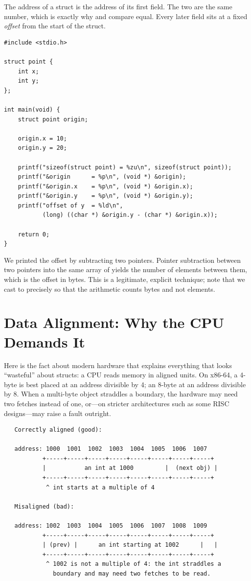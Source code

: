 The address of a struct is the address of its first field. The two are
the same number, which is exactly why  and
 compare equal. Every later field sits at a fixed
\emph{offset} from the start of the struct.

\begin{lstlisting}[caption={A struct is an int and another int, one after another.}]
#include <stdio.h>

struct point {
    int x;
    int y;
};

int main(void) {
    struct point origin;

    origin.x = 10;
    origin.y = 20;

    printf("sizeof(struct point) = %zu\n", sizeof(struct point));
    printf("&origin      = %p\n", (void *) &origin);
    printf("&origin.x    = %p\n", (void *) &origin.x);
    printf("&origin.y    = %p\n", (void *) &origin.y);
    printf("offset of y  = %ld\n",
           (long) ((char *) &origin.y - (char *) &origin.x));

    return 0;
}
\end{lstlisting}

We printed the offset by subtracting two  pointers. Pointer
subtraction between two pointers into the same array of 
yields the number of  elements between them, which is the
offset in bytes. This is a legitimate, explicit technique; note that we
cast to  precisely so that the arithmetic counts bytes and
not elements.

\section{Data Alignment: Why the CPU Demands It}

Here is the fact about modern hardware that explains everything that
looks ``wasteful'' about structs: a CPU reads memory in aligned units.
On x86-64, a 4-byte  is best placed at an address divisible
by 4; an 8-byte  at an address divisible by 8. When a
multi-byte object straddles a boundary, the hardware may need two
fetches instead of one, or---on stricter architectures such as some
RISC designs---may raise a fault outright.

\begin{verbatim}
   Correctly aligned (good):

   address: 1000  1001  1002  1003  1004  1005  1006  1007
           +-----+-----+-----+-----+-----+-----+-----+-----+
           |           an int at 1000         |  (next obj) |
           +-----+-----+-----+-----+-----+-----+-----+-----+
            ^ int starts at a multiple of 4

   Misaligned (bad):

   address: 1002  1003  1004  1005  1006  1007  1008  1009
           +-----+-----+-----+-----+-----+-----+-----+-----+
           | (prev) |      an int starting at 1002      |   |
           +-----+-----+-----+-----+-----+-----+-----+-----+
            ^ 1002 is not a multiple of 4: the int straddles a
              boundary and may need two fetches to be read.
\end{verbatim}

